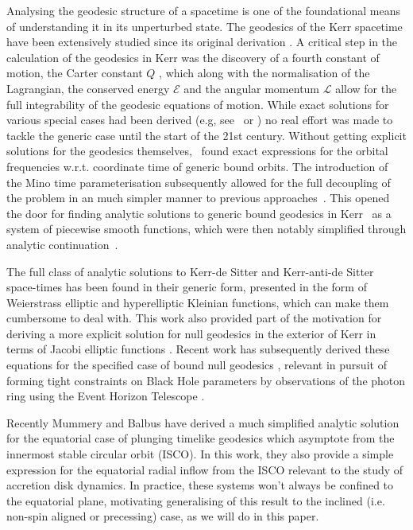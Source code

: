 \documentclass[12pt, amsmath]{revtex4-2}
\newcommand\EN{\mathcal{E}}
\newcommand\ANG{\mathcal{L}}
\begin{document}
Analysing the geodesic structure of a spacetime is one of the foundational means of understanding it in its unperturbed state. The geodesics of the Kerr spacetime have been extensively studied since its original derivation \cite{Kerr:1963ud}. A critical step in the calculation of the geodesics in Kerr was the discovery of a fourth constant of motion, the Carter constant $Q$ \cite{Carter:1968rr}, which along with the normalisation of the Lagrangian, the conserved energy $\EN$ and the angular momentum $\ANG$ allow for the full integrability of the geodesic equations of motion. While exact solutions for various special cases had been derived (e.g, see~\cite{Chandrasekhar:579245} or \cite{Wilkins:1972rs}) no real effort was made to tackle the generic case until the start of the 21st century. Without getting explicit solutions for the geodesics themselves, \cite{Schmidt:2002qk}~found exact expressions for the orbital frequencies w.r.t. coordinate time of generic bound orbits. The introduction of the Mino time parameterisation \cite{Mino:2003yg} subsequently allowed for the full decoupling of the problem in an much simpler manner to previous approaches~\cite{Carter:1968rr}.
This opened the door for finding analytic solutions to generic bound geodesics in Kerr~\cite{Fujita:2009bp} as a system of piecewise smooth functions, which were then notably simplified through analytic continuation~\cite{vandeMeent:2019cam}.

The full class of analytic solutions to  Kerr-de Sitter and Kerr-anti-de Sitter space-times has been found in \cite{Hackmann:2010zz} their generic form, presented in the form of Weierstrass elliptic and hyperelliptic Kleinian functions, which can make them cumbersome to deal with. This work also provided part of the motivation for deriving a more explicit solution for null geodesics in the exterior of Kerr in terms of Jacobi elliptic functions \cite{Gralla:2019ceu}. Recent work has subsequently derived these equations for the specified case of bound null geodesics \cite{Omwoyo2022:2212.10492v1}, relevant in pursuit of forming tight constraints on Black Hole parameters by observations of the photon ring using the Event Horizon Telescope \cite{broderick2022photon}.

Recently Mummery and Balbus \cite{Mummery:2022ana} have  derived a much simplified analytic solution for the equatorial case of plunging timelike geodesics which asymptote from the innermost stable circular orbit (ISCO). In this work, they also provide a simple expression for the equatorial radial inflow from the ISCO relevant to the study of accretion disk dynamics. In practice, these systems won't always be confined to the equatorial plane, motivating generalising of this result to the inclined (i.e. non-spin aligned or precessing) case, as we will do in this paper.
\end{document}
